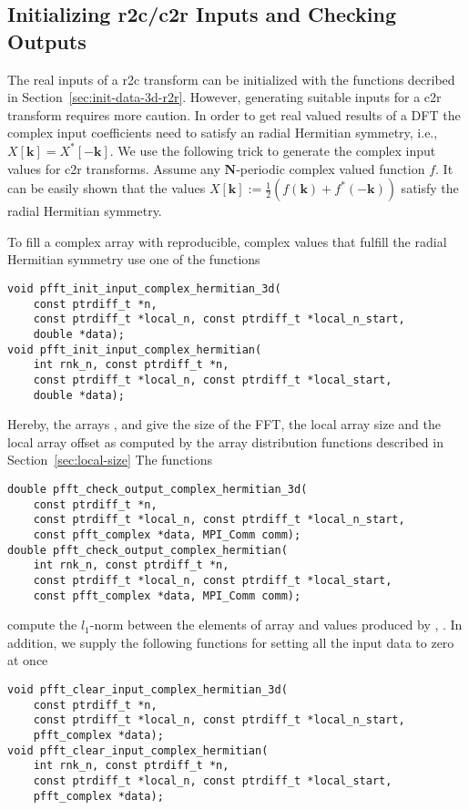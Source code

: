\subsection{Initializing r2c/c2r Inputs and Checking Outputs}\label{sec:init-data-3d-r2c}
The real inputs of a r2c transform can be initialized with the functions decribed in Section~\ref{sec:init-data-3d-r2r}.
However, generating suitable inputs for a c2r transform requires more caution.
In order to get real valued results of a DFT the complex input coefficients need to satisfy an radial Hermitian symmetry, i.e., $X[\mathbf k] = {X^*[-\mathbf k]}$.
We use the following trick to generate the complex input values for c2r transforms.
Assume any $\mathbf N$-periodic complex valued function $f$. It can be easily shown that the values
$X[\mathbf k] := \frac{1}{2}\left(f(\mathbf k)+f^*(-\mathbf k)\right)$ satisfy the radial Hermitian symmetry. 

To fill a complex array  with reproducible, complex values that fulfill the radial Hermitian symmetry use one of the functions
\begin{lstlisting}
void pfft_init_input_complex_hermitian_3d(
    const ptrdiff_t *n,
    const ptrdiff_t *local_n, const ptrdiff_t *local_n_start,
    double *data);
void pfft_init_input_complex_hermitian(
    int rnk_n, const ptrdiff_t *n,
    const ptrdiff_t *local_n, const ptrdiff_t *local_start,
    double *data);
\end{lstlisting}
Hereby, the arrays ,  and  give the size of the FFT, the local array size and the local array offset
as computed by the array distribution functions described in Section~\ref{sec:local-size}
The functions
\begin{lstlisting}
double pfft_check_output_complex_hermitian_3d(
    const ptrdiff_t *n,
    const ptrdiff_t *local_n, const ptrdiff_t *local_n_start,
    const pfft_complex *data, MPI_Comm comm);
double pfft_check_output_complex_hermitian(
    int rnk_n, const ptrdiff_t *n,
    const ptrdiff_t *local_n, const ptrdiff_t *local_start,
    const pfft_complex *data, MPI_Comm comm);
\end{lstlisting}
compute the $l_1$-norm between the elements of array  and values produced by , .
In addition, we supply the following functions for setting all the input data to zero at once
\begin{lstlisting}
void pfft_clear_input_complex_hermitian_3d(
    const ptrdiff_t *n,
    const ptrdiff_t *local_n, const ptrdiff_t *local_n_start,
    pfft_complex *data);
void pfft_clear_input_complex_hermitian(
    int rnk_n, const ptrdiff_t *n,
    const ptrdiff_t *local_n, const ptrdiff_t *local_start,
    pfft_complex *data);
\end{lstlisting}

